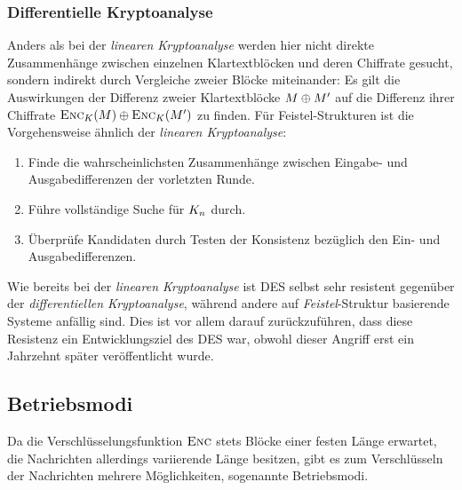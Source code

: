 \subsubsection{Differentielle Kryptoanalyse}
\label{sssec:diffKryptoanalyse}
Anders als bei der \textit{linearen Kryptoanalyse} werden hier nicht direkte Zusammenhänge zwischen einzelnen Klartextblöcken und deren Chiffrate gesucht, sondern indirekt durch Vergleiche zweier Blöcke miteinander: Es gilt die Auswirkungen der Differenz zweier Klartextblöcke $M \oplus M'$ auf die Differenz ihrer Chiffrate $\textsc{Enc}_{K}(M) \oplus \textsc{Enc}_{K}(M')$ zu finden.
Für Feistel-Strukturen ist die Vorgehensweise ähnlich der \textit{linearen Kryptoanalyse}:

\begin{enumerate}
	\item Finde die wahrscheinlichsten Zusammenhänge zwischen Eingabe- und Ausgabedifferenzen der vorletzten Runde.
	\item Führe vollständige Suche für $K_n$ durch.
	\item Überprüfe Kandidaten durch Testen der Konsistenz bezüglich den Ein- und Ausgabedifferenzen.
\end{enumerate}

Wie bereits bei der \textit{linearen Kryptoanalyse} ist DES selbst sehr resistent gegenüber der \textit{differentiellen Kryptoanalyse}, während andere auf \textit{Feistel}-Struktur basierende Systeme anfällig sind. Dies ist vor
allem darauf zurückzuführen, dass diese Resistenz ein Entwicklungsziel des DES war, obwohl dieser Angriff erst ein Jahrzehnt später veröffentlicht wurde.

\subsection{Betriebsmodi}
Da die Verschlüsselungsfunktion $\textsc{Enc}$ stets Blöcke einer festen Länge erwartet, die Nachrichten allerdings variierende Länge besitzen, gibt es zum Verschlüsseln der Nachrichten mehrere Möglichkeiten, sogenannte Betriebsmodi.

